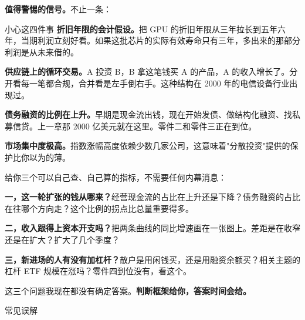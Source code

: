 \textbf{值得警惕的信号。}不止一条：

\begin{warnbox}{小心这四件事}
\textbf{折旧年限的会计假设。}把 GPU 的折旧年限从三年拉长到五年六年，当期利润立刻好看。如果这批芯片的实际有效寿命只有三年，多出来的那部分利润是从未来借的。

\textbf{供应链上的循环交易。}A 投资 B，B 拿这笔钱买 A 的产品，A 的收入增长了。分开看每一笔都合规，合并看是左手倒右手。这种结构在 2000 年的电信设备行业出现过。

\textbf{债务融资的比例在上升。}早期是现金流出钱，现在开始发债、做结构化融资、找私募信贷。上一章那 2000 亿美元就在这里。零件二和零件三正在到位。

\textbf{市场集中度极高。}指数涨幅高度依赖少数几家公司，这意味着"分散投资"提供的保护比你以为的薄。

\end{warnbox}

\begin{talkbox}
\end{talkbox}

给你三个可以自己查、自己算的指标，不需要任何内幕消息：

\textbf{一，这一轮扩张的钱从哪来？}经营现金流的占比在上升还是下降？债务融资的占比在往哪个方向走？这个比例的拐点比总量重要得多。

\textbf{二，收入跟得上资本开支吗？}把两条曲线的同比增速画在一张图上。差距是在收窄还是在扩大？扩大了几个季度？

\textbf{三，新进场的人有没有加杠杆？}散户是用闲钱买，还是用融资余额买？相关主题的杠杆 ETF 规模在涨吗？零件四到位没有，看这个。

这三个问题我现在都没有确定答案。\textbf{判断框架给你，答案时间会给。}

\begin{mythbox}{常见误解}
\end{mythbox}


